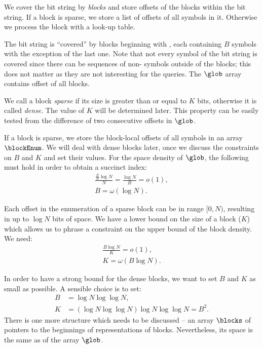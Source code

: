 We cover the bit string by \emph{blocks} and store offsets of the blocks within the bit string.
If a block is sparse, we store a list of offsets of all symbols \ph{} in it.
Otherwise we process the block with a look-up table.

The bit string is ``covered'' by blocks beginning with \ph{}, each containing $B$ symbols \ph{} with the exception of the last one.
Note that not every symbol of the bit string is covered since there can be sequences of non-\ph{} symbols outside of the blocks; this does not matter as they are not interesting for the queries.
The $\glob$ array contains offset of all blocks.

We call a block \emph{sparse} if its size is greater than or equal to $K$ bits, otherwise it is called \emph{dense}.
The value of $K$ will be determined later.
This property can be easily tested from the difference of two consecutive offsets in $\glob$.

If a block is sparse, we store the block-local offsets of all symbols \ph{} in an array $\blockEnum$.
We will deal with dense blocks later, once we discuss the constraints on $B$ and $K$ and set their values.
For the space density of $\glob$, the following must hold in order to obtain a succinct index:
\begin{gather*}
\frac{\frac{N}{B} \log N}{N} = \frac{\log N}{B} = o(1), \\
B = \omega(\log N).
\end{gather*}

Each offset in the enumeration of a sparse block can be in range $[0, N)$, resulting in up to $\log N$ bits of space.
We have a lower bound on the size of a block ($K$) which allows us to phrase a constraint on the upper bound of the block density.
We need:
\begin{gather*}
\frac{B \log N}{K} = o(1), \\
K = \omega(B \log N).
\end{gather*}

In order to have a strong bound for the dense blocks, we want to set $B$ and $K$ as small as possible.
A sensible choice is to set:
\begin{align*}
	B &= \log N \log \log N, \\
	K &= (\log N \log \log N) \log N \log \log N = B^2.
\end{align*}
There is one more structure which needs to be discussed -- an array $\blocks$ of pointers to the beginnings of representations of blocks.
Nevertheless, its space is the same as of the array $\glob$.

